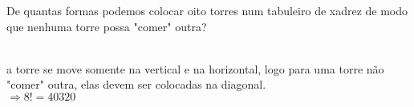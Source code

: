 \begin{ex}
 De quantas formas podemos colocar oito torres num tabuleiro de xadrez de modo que nenhuma torre possa "comer" outra?
   \begin{sol}
    \phantom{A} \\
     a torre se move somente na vertical e na horizontal, logo para uma torre não "comer" outra, elas devem ser colocadas na diagonal.\\ $\Longrightarrow 8!=40320$
   \end{sol}
\end{ex}
